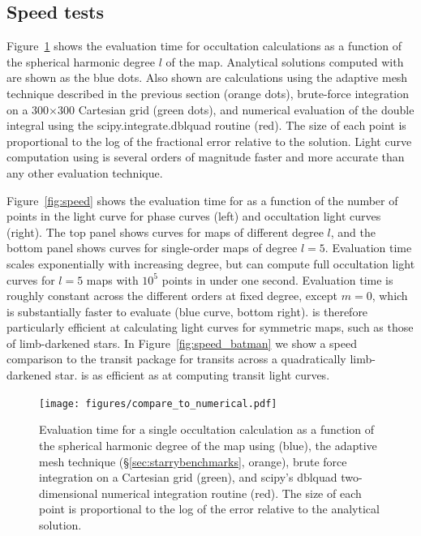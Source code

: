 \documentclass[modern]{aastex61}
\begin{document}
\subsection{Speed tests}
\label{sec:starryspeed}

Figure~\ref{fig:compare_to_numerical} shows the evaluation time for
occultation calculations as a function of the spherical
harmonic degree $l$ of the map. Analytical solutions computed with \starry
are shown as the blue dots. Also shown are calculations using the adaptive
mesh technique described in the previous section (orange dots),
brute-force integration on a 300$\times$300 Cartesian grid (green dots),
and numerical evaluation of the double integral using the
\textsf{scipy.integrate.dblquad} \citep{scipy} routine (red). The size of each point
is proportional to the log of the fractional error relative to the
\starry solution. Light curve computation using \starry is several orders of
magnitude faster and more accurate than any other evaluation technique.

Figure~\ref{fig:speed} shows the evaluation time for \starry
as a function of the number of points in the light curve for phase curves
(left) and occultation light curves (right). The top panel shows curves for
maps of different degree $l$, and the bottom panel shows curves for single-order
maps of degree $l = 5$. Evaluation time scales exponentially with increasing
degree, but \starry can compute full occultation light curves for $l = 5$ maps
with $10^5$ points in under one second. Evaluation time is roughly constant
across the different orders at fixed degree, except $m = 0$, which is substantially
faster to evaluate (blue curve, bottom right). \starry is therefore particularly
efficient at calculating light curves for symmetric maps, such as those of
limb-darkened stars. In Figure~\ref{fig:speed_batman} we show a speed comparison
to the \batman transit package \citep{Kreidberg2015} for transits across a
quadratically limb-darkened star. \starry is as efficient as \batman at
computing transit light curves.

\begin{figure}[ht!]
    \begin{centering}
    \texttt{[image: figures/compare\_to\_numerical.pdf]}
    \caption{\label{fig:compare_to_numerical}
             Evaluation time for a single occultation calculation as a function
             of the spherical harmonic degree of the map using
             \starry (blue), the adaptive mesh technique (\S\ref{sec:starrybenchmarks}, orange),
             brute force integration on a Cartesian grid (green), and
             \textsf{scipy}'s \textsf{dblquad} two-dimensional numerical
             integration routine (red).
             The size of each point is proportional to the log of the error relative
             to the \starry analytical solution.
             }
    \end{centering}
\end{figure}
\end{document}
